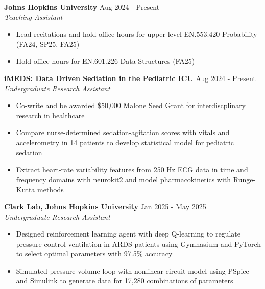 \documentclass[11pt]{article}       %
\begin{document}
\textbf{Johns Hopkins University} \hfill Aug 2024 - Present \\
\textit{Teaching Assistant} \vspace{-9pt} \\
\begin{itemize}
  \item Lead recitations and hold office hours for upper-level EN.553.420 Probability (FA24, SP25, FA25)
  \item Hold office hours for EN.601.226 Data Structures (FA25)
\end{itemize}

\textbf{iMEDS: Data Driven Sediation in the Pediatric ICU} \hfill Aug 2024 - Present\\
\textit{Undergraduate Research Assistant} \vspace{-9pt}
\begin{itemize}
  \item Co-write and be awarded \$50,000 Malone Seed Grant for interdiscplinary research in healthcare
  \item Compare nurse-determined sedation-agitation scores with vitals and accelerometry in 14 patients to develop statistical model for pediatric sedation
  \item Extract heart-rate variability features from 250 Hz ECG data in time and frequency domains with neurokit2 and model pharmacokinetics with Runge-Kutta methods
\end{itemize}

\textbf{Clark Lab, Johns Hopkins University} \hfill Jan 2025 - May 2025 \\
\textit{Undergraduate Research Assistant} \vspace{-9pt} \\
\begin{itemize}
  \item Designed reinforcement learning agent with deep Q-learning to regulate pressure-control ventilation in ARDS patients using Gymnasium and PyTorch to select optimal parameters with 97.5\% accuracy
  \item Simulated pressure-volume loop with nonlinear circuit model using PSpice and Simulink to generate data for 17,280 combinations of parameters
\end{itemize}
\end{document}
